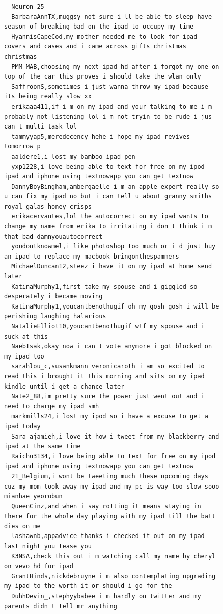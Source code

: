 \begin{figure}[htpb]
\begin{verbatim}
  Neuron 25
  BarbaraAnnTX,muggsy not sure i ll be able to sleep have season of breaking bad on the ipad to occupy my time
  HyannisCapeCod,my mother needed me to look for ipad covers and cases and i came across gifts christmas christmas
  PMM_MAB,choosing my next ipad hd after i forgot my one on top of the car this proves i should take the wlan only
  SaffroonS,sometimes i just wanna throw my ipad because its being really slow xx
  erikaaa411,if i m on my ipad and your talking to me i m probably not listening lol i m not tryin to be rude i jus can t multi task lol
  tammyyap5,meredecency hehe i hope my ipad revives tomorrow p
  aaldere1,i lost my bamboo ipad pen
  yxp1228,i love being able to text for free on my ipod ipad and iphone using textnowapp you can get textnow
  DannyBoyBingham,ambergaelle i m an apple expert really so u can fix my ipad no but i can tell u about granny smiths royal galas honey crisps
  erikacervantes,lol the autocorrect on my ipad wants to change my name from erika to irritating i don t think i m that bad damnyouautocorrect
  youdontknowmel,i like photoshop too much or i d just buy an ipad to replace my macbook bringonthespammers
  MichaelDuncan12,steez i have it on my ipad at home send later
  KatinaMurphy1,first take my spouse and i giggled so desperately i became moving
  KatinaMurphy1,youcantbenothugif oh my gosh gosh i will be perishing laughing halarious
  NatalieElliot10,youcantbenothugif wtf my spouse and i suck at this
  NaebIsak,okay now i can t vote anymore i got blocked on my ipad too
  sarahlou_c,susankmann veronicaroth i am so excited to read this i brought it this morning and sits on my ipad kindle until i get a chance later
  Nate2_88,im pretty sure the power just went out and i need to charge my ipad smh
  markmills24,i lost my ipod so i have a excuse to get a ipad today
  Sara_ajamieh,i love it how i tweet from my blackberry and ipad at the same time
  Raichu3134,i love being able to text for free on my ipod ipad and iphone using textnowapp you can get textnow
  21_Belgium,i wont be tweeting much these upcoming days cuz my mom took away my ipad and my pc is way too slow sooo mianhae yeorobun
  QueenCinz,and when i say rotting it means staying in there for the whole day playing with my ipad till the batt dies on me
  lashawnb,appadvice thanks i checked it out on my ipad last night you tease you
  K3NSA,check this out i m watching call my name by cheryl on vevo hd for ipad
  GrantHinds,nickdebruyne i m also contemplating upgrading my ipad to the worth it or should i go for the
  DuhhDevin_,stephyybabee i m hardly on twitter and my parents didn t tell mr anything

\end{verbatim}
\end{figure}
